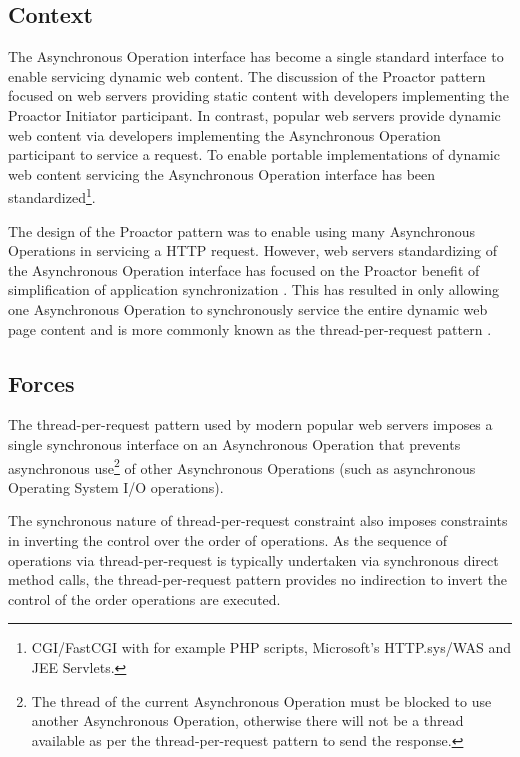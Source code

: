 \documentclass[prodmode]{style/acmlarge}
\begin{document}
\subsection{Context}

The Asynchronous Operation interface has become a single standard interface to
enable servicing dynamic web content.  The discussion of the Proactor pattern
focused on web servers providing static content with developers implementing the
Proactor Initiator participant.  In contrast, popular web servers provide
dynamic web content via developers implementing the Asynchronous Operation
participant to service a request.  To enable portable implementations of dynamic
web content servicing the Asynchronous Operation interface has been
standardized\footnote{CGI/FastCGI with for example PHP scripts, Microsoft's
HTTP.sys/WAS and JEE Servlets.}.

The design of the Proactor pattern was to enable using many Asynchronous
Operations in servicing a HTTP request.  However, web servers standardizing of
the Asynchronous Operation interface has focused on the Proactor benefit of
simplification of application synchronization \cite[p. 7]{proactor}.  This has
resulted in only allowing one Asynchronous Operation to synchronously service
the entire dynamic web page content and is more commonly known as the
thread-per-request pattern \cite{thread-per-request}.


\subsection{Forces}

The thread-per-request pattern used by modern popular web servers imposes a
single synchronous interface on an Asynchronous Operation that prevents
asynchronous use\footnote{The thread of the current Asynchronous Operation must
be blocked to use another Asynchronous Operation, otherwise there will not be a
thread available as per the thread-per-request pattern to send the response.} of
other Asynchronous Operations (such as asynchronous Operating System I/O
operations).

The synchronous nature of thread-per-request constraint also imposes constraints
in inverting the control over the order of operations.  As the sequence of
operations via thread-per-request is typically undertaken via synchronous direct
method calls, the thread-per-request pattern provides no indirection to invert
the control of the order operations are executed.
\end{document}
